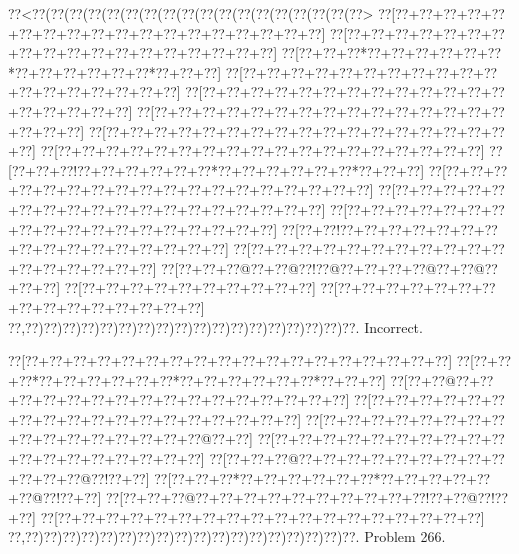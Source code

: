 \documentclass[a5paper]{article}
\begin{document}
\begin{center}
{\goo
\0??<\0??(\0??(\0??(\0??(\0??(\0??(\0??(\0??(\0??(\0??(\0??(\0??(\0??(\0??(\0??(\0??(\0??(\0??>
\0??[\0??+\0??+\0??+\0??+\0??+\0??+\0??+\0??+\0??+\0??+\0??+\0??+\0??+\0??+\0??+\0??+\0??+\0??]
\0??[\0??+\0??+\0??+\0??+\0??+\0??+\0??+\0??+\0??+\0??+\0??+\0??+\0??+\0??+\0??+\0??+\0??+\0??]
\0??[\0??+\0??+\0??*\0??+\0??+\0??+\0??+\0??+\0??*\0??+\0??+\0??+\0??+\0??+\0??*\0??+\0??+\0??]
\0??[\0??+\0??+\0??+\0??+\0??+\0??+\0??+\0??+\0??+\0??+\0??+\0??+\0??+\0??+\0??+\0??+\0??+\0??]
\0??[\0??+\0??+\0??+\0??+\0??+\0??+\0??+\0??+\0??+\0??+\0??+\0??+\0??+\0??+\0??+\0??+\0??+\0??]
\0??[\0??+\0??+\0??+\0??+\0??+\0??+\0??+\0??+\0??+\0??+\0??+\0??+\0??+\0??+\0??+\0??+\0??+\0??]
\0??[\0??+\0??+\0??+\0??+\0??+\0??+\0??+\0??+\0??+\0??+\0??+\0??+\0??+\0??+\0??+\0??+\0??+\0??]
\0??[\0??+\0??+\0??+\0??+\0??+\0??+\0??+\0??+\0??+\0??+\0??+\0??+\0??+\0??+\0??+\0??+\0??+\0??]
\0??[\0??+\0??+\0??!\0??+\0??+\0??+\0??+\0??+\0??*\0??+\0??+\0??+\0??+\0??+\0??*\0??+\0??+\0??]
\0??[\0??+\0??+\0??+\0??+\0??+\0??+\0??+\0??+\0??+\0??+\0??+\0??+\0??+\0??+\0??+\0??+\0??+\0??]
\0??[\0??+\0??+\0??+\0??+\0??+\0??+\0??+\0??+\0??+\0??+\0??+\0??+\0??+\0??+\0??+\0??+\0??+\0??]
\0??[\0??+\0??+\0??+\0??+\0??+\0??+\0??+\0??+\0??+\0??+\0??+\0??+\0??+\0??+\0??+\0??+\0??+\0??]
\0??[\0??+\0??!\0??+\0??+\0??+\0??+\0??+\0??+\0??+\0??+\0??+\0??+\0??+\0??+\0??+\0??+\0??+\0??]
\0??[\0??+\0??+\0??+\0??+\0??+\0??+\0??+\0??+\0??+\0??+\0??+\0??+\0??+\0??+\0??+\0??+\0??]
\0??[\0??+\0??+\0??@\0??+\0??@\0??!\0??@\0??+\0??+\0??+\0??@\0??+\0??@\0??+\0??+\0??]
\0??[\0??+\0??+\0??+\0??+\0??+\0??+\0??+\0??+\0??+\0??]
\0??[\0??+\0??+\0??+\0??+\0??+\0??+\0??+\0??+\0??+\0??+\0??+\0??+\0??+\0??+\0??]
\0??,\0??)\0??)\0??)\0??)\0??)\0??)\0??)\0??)\0??)\0??)\0??)\0??)\0??)\0??)\0??)\0??)\0??)\0??.
}
Incorrect. 

\end{center}
\newpage
\begin{center}
{\goo
\0??[\0??+\0??+\0??+\0??+\0??+\0??+\0??+\0??+\0??+\0??+\0??+\0??+\0??+\0??+\0??+\0??+\0??+\0??]
\0??[\0??+\0??+\0??*\0??+\0??+\0??+\0??+\0??+\0??*\0??+\0??+\0??+\0??+\0??+\0??*\0??+\0??+\0??]
\0??[\0??+\0??@\0??+\0??+\0??+\0??+\0??+\0??+\0??+\0??+\0??+\0??+\0??+\0??+\0??+\0??+\0??+\0??]
\0??[\0??+\0??+\0??+\0??+\0??+\0??+\0??+\0??+\0??+\0??+\0??+\0??+\0??+\0??+\0??+\0??+\0??+\0??]
\0??[\0??+\0??+\0??+\0??+\0??+\0??+\0??+\0??+\0??+\0??+\0??+\0??+\0??+\0??+\0??+\0??@\0??+\0??]
\0??[\0??+\0??+\0??+\0??+\0??+\0??+\0??+\0??+\0??+\0??+\0??+\0??+\0??+\0??+\0??+\0??+\0??+\0??]
\0??[\0??+\0??+\0??@\0??+\0??+\0??+\0??+\0??+\0??+\0??+\0??+\0??+\0??+\0??+\0??@\0??!\0??+\0??]
\0??[\0??+\0??+\0??*\0??+\0??+\0??+\0??+\0??+\0??*\0??+\0??+\0??+\0??+\0??+\0??@\0??!\0??+\0??]
\0??[\0??+\0??+\0??@\0??+\0??+\0??+\0??+\0??+\0??+\0??+\0??+\0??+\0??!\0??+\0??@\0??!\0??+\0??]
\0??[\0??+\0??+\0??+\0??+\0??+\0??+\0??+\0??+\0??+\0??+\0??+\0??+\0??+\0??+\0??+\0??+\0??+\0??]
\0??,\0??)\0??)\0??)\0??)\0??)\0??)\0??)\0??)\0??)\0??)\0??)\0??)\0??)\0??)\0??)\0??)\0??)\0??.
}
Problem 266.

\end{center}
\end{document}
